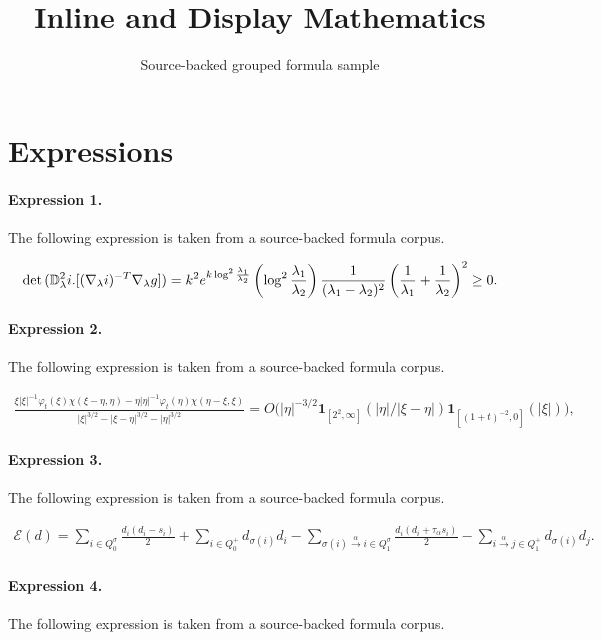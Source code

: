 \documentclass[11pt]{article}
\title{Inline and Display Mathematics}
\author{Source-backed grouped formula sample}
\date{}
\begin{document}
\maketitle
\section{Expressions}
\paragraph{Expression 1.} The following expression is taken from a source-backed formula corpus.

\begin{align*}{\rm det}\, ( \mathbb{D}^2_\lambda i.[(\nabla_\lambda i)^{-T}\nabla_\lambda g])=k^2 e^{k \log ^2\frac{\lambda_1}{\lambda_2}} \left(\log^2 \frac{\lambda_1}{\lambda_2}\right)\frac{1}{(\lambda_1-\lambda_2)^2}\left(\frac{1}{\lambda_1}+\frac{1}{ \lambda_2}\right)^2\geq 0.\end{align*}

\paragraph{Expression 2.} The following expression is taken from a source-backed formula corpus.

\begin{align*}\frac{\xi|\xi|^{-1} \varphi_t(\xi) \chi(\xi-\eta,\eta) - \eta|\eta|^{-1} \varphi_t(\eta) \chi(\eta-\xi,\xi)}{ |\xi|^{3/2} -|\xi-\eta|^{3/2} - |\eta|^{3/2}} = O \big( |\eta|^{-3/2} \mathbf{1}_{[2^2,\infty]}(|\eta|/|\xi-\eta|) \mathbf{1}_{[(1+t)^{-2},0]}(|\xi|) \big) ,\end{align*}

\paragraph{Expression 3.} The following expression is taken from a source-backed formula corpus.

\begin{align*}\mathcal{E}(d)=\sum_{i \in Q_0^{\sigma}} \frac{d_i(d_i -s_i)}{2} + \sum_{i \in Q_0^+} d_{\sigma(i)} d_i - \sum_{\sigma(i) \xrightarrow[]{\alpha} i \in Q_1^{\sigma}} \frac{d_i(d_i + \tau_{\alpha} s_i)}{2} -\sum_{i \xrightarrow[]{\alpha} j \in Q_1^+} d_{\sigma(i)} d_j.\end{align*}

\paragraph{Expression 4.} The following expression is taken from a source-backed formula corpus.
\end{document}
